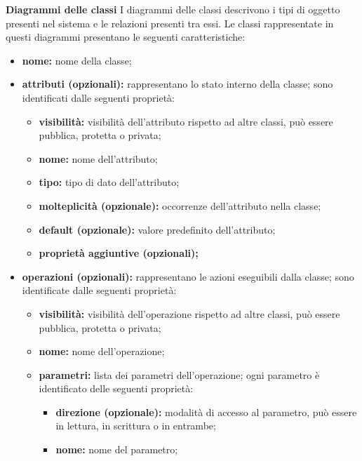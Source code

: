 						\textbf{Diagrammi delle classi}
						\newline
						\newline
						\hangindent=0.6cm I diagrammi delle classi descrivono i tipi di oggetto presenti nel sistema e le relazioni presenti tra essi.
						\newline
						\hangindent=0.6cm Le classi rappresentate in questi diagrammi presentano le seguenti caratteristiche:
						\begin{itemize}[leftmargin=1.5cm]
							\item \textbf{nome:} nome della classe;
							\item \textbf{attributi (opzionali):} rappresentano lo stato interno della classe; sono identificati dalle seguenti proprietà:
							\begin{itemize}
								\item \textbf{visibilità:} visibilità dell'attributo rispetto ad altre classi, può essere pubblica, protetta o privata;
								\item \textbf{nome:} nome dell'attributo;
								\item \textbf{tipo:} tipo di dato dell'attributo;
								\item \textbf{molteplicità (opzionale):} occorrenze dell'attributo nella classe;
								\item \textbf{default (opzionale):} valore predefinito dell'attributo;
								\item \textbf{proprietà aggiuntive (opzionali);}
							\end{itemize}
							\item \textbf{operazioni (opzionali):} rappresentano le azioni eseguibili dalla classe; sono identificate dalle seguenti proprietà:
							\begin{itemize}
								\item \textbf{visibilità:} visibilità dell'operazione rispetto ad altre classi, può essere pubblica, protetta o privata;
								\item \textbf{nome:} nome dell'operazione;
								\item \textbf{parametri:} lista dei parametri dell'operazione; ogni parametro è identificato delle seguenti proprietà:
								\begin{itemize}
									\item \textbf{direzione (opzionale):} modalità di accesso al parametro, può essere in lettura, in scrittura o in entrambe;
									\item \textbf{nome:} nome del parametro;

\end{itemize}
\end{itemize}
\end{itemize}
